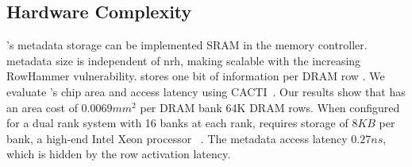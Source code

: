 \subsection{Hardware Complexity}
\label{sec:eval_area}
{\X{}'s metadata storage  can be implemented  SRAM in the memory controller.  metadata size is independent of \gls{nrh}, making \X{} scalable with the increasing RowHammer vulnerability.}
\X{} stores one bit of information per DRAM row . We evaluate \X{}'s chip area and access latency  using CACTI~\cite{cacti}. Our results show that \X{} has an area cost of $0.0069mm^2$ per DRAM bank  64K DRAM rows.
When configured for a dual rank system with 16 banks at each rank, \X{} requires storage of $8KB$ per bank,
 a high-end Intel Xeon processor~\cite{wikichipcascade} .
The metadata access latency   $0.27ns$, which is  hidden by the row activation latency.

